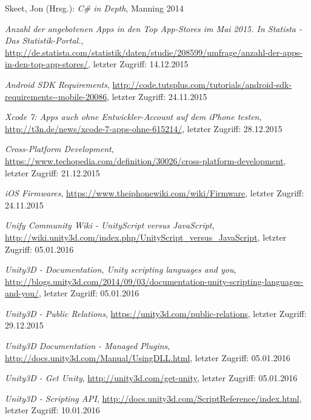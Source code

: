 \begin{thebibliography}{}
Skeet, Jon (Hrsg.): 
\emph{C\# in Depth}, Manning 2014

\emph{Anzahl der angebotenen Apps in den Top App-Stores im Mai 2015. In Statista - Das Statistik-Portal.},
\url{http://de.statista.com/statistik/daten/studie/208599/umfrage/anzahl-der-apps-in-den-top-app-stores/}, letzter Zugriff: 14.12.2015

\emph{Android SDK Requirements},
\url{http://code.tutsplus.com/tutorials/android-sdk-requirements--mobile-20086}, letzter Zugriff: 24.11.2015

\emph{Xcode 7: Apps auch ohne Entwickler-Account auf dem iPhone testen},
\url{http://t3n.de/news/xcode-7-apps-ohne-615214/}, letzter Zugriff: 28.12.2015

\emph{Cross-Platform Development},
\url{https://www.techopedia.com/definition/30026/cross-platform-development}, letzter Zugriff: 21.12.2015

\emph{iOS Firmwares},
\url{https://www.theiphonewiki.com/wiki/Firmware}, letzter Zugriff: 24.11.2015

\emph{Unify Community Wiki - UnityScript versus JavaScript},
\url{http://wiki.unity3d.com/index.php/UnityScript_versus_JavaScript}, letzter Zugriff: 05.01.2016

\emph{Unity3D - Documentation, Unity scripting languages and you},
\url{http://blogs.unity3d.com/2014/09/03/documentation-unity-scripting-languages-and-you/}, letzter Zugriff: 05.01.2016

\emph{Unity3D - Public Relations},
\url{https://unity3d.com/public-relations}, letzter Zugriff: 29.12.2015

\emph{Unity3D Documentation - Managed Plugins},
\url{http://docs.unity3d.com/Manual/UsingDLL.html}, letzter Zugriff: 05.01.2016

\emph{Unity3D - Get Unity},
\url{http://unity3d.com/get-unity}, letzter Zugriff: 05.01.2016

\emph{Unity3D - Scripting API},
\url{http://docs.unity3d.com/ScriptReference/index.html}, letzter Zugriff: 10.01.2016


\end{thebibliography}
